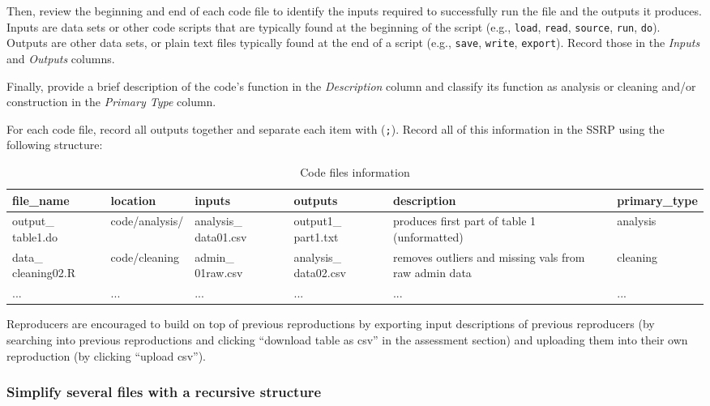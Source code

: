 \documentclass[
  openany]{book}
\begin{document}
Then, review the beginning and end of each code file to identify the inputs required to successfully run the file and the outputs it produces. Inputs are data sets or other code scripts that are typically found at the beginning of the script (e.g., \texttt{load}, \texttt{read}, \texttt{source}, \texttt{run}, \texttt{do}). Outputs are other data sets, or plain text files typically found at the end of a script (e.g., \texttt{save}, \texttt{write}, \texttt{export}). Record those in the \emph{Inputs} and \emph{Outputs} columns.

Finally, provide a brief description of the code's function in the \emph{Description} column and classify its function as analysis or cleaning and/or construction in the \emph{Primary Type} column.

For each code file, record all outputs together and separate each item with (\texttt{;}). Record all of this information in the SSRP using the following structure:

\begin{table}[!h]

\caption{\label{tab:code-files-information}Code files information}
\centering
\begin{tabu} to 
\hline
file\_name & location & inputs & outputs & description & primary\_type\\
\hline
output\_ table1.do & code/analysis/ & analysis\_ data01.csv & output1\_ part1.txt & produces first part of table 1 (unformatted) & analysis\\
\hline
data\_ cleaning02.R & code/cleaning & admin\_ 01raw.csv & analysis\_ data02.csv & removes outliers and missing vals from raw admin data & cleaning\\
\hline
... & ... & ... & ... & ... & ...\\
\hline
\end{tabu}
\end{table}

Reproducers are encouraged to build on top of previous reproductions by exporting input descriptions of previous reproducers (by searching into previous reproductions and clicking ``download table as csv'' in the assessment section) and uploading them into their own reproduction (by clicking ``upload csv'').

\hypertarget{simplify-several-files-with-a-recursive-structure}{%
\subsubsection{Simplify several files with a recursive structure}\label{simplify-several-files-with-a-recursive-structure}}
\end{document}
